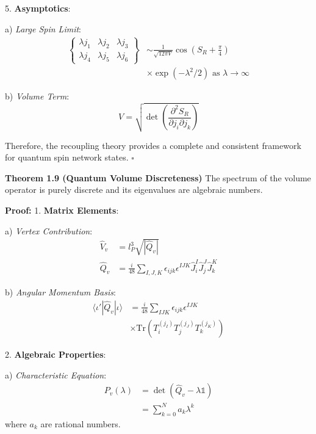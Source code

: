\documentclass[12pt,a4paper]{article}
\begin{document}
5. \textbf{Asymptotics}:
   
   a) \textit{Large Spin Limit}:
      \[
      \begin{aligned}
      \begin{Bmatrix}
      \lambda j_1 & \lambda j_2 & \lambda j_3 \\
      \lambda j_4 & \lambda j_5 & \lambda j_6
      \end{Bmatrix} &\sim \frac{1}{\sqrt{12\pi V}}\cos(S_R + \frac{\pi}{4}) \\
      &\times \exp(-\lambda^2/2) \text{ as } \lambda \to \infty
      \end{aligned}
      \]
   
   b) \textit{Volume Term}:
      \[
      V = \sqrt{\det(\frac{\partial^2 S_R}{\partial j_i \partial j_k})}
      \]

Therefore, the recoupling theory provides a complete and consistent framework for quantum spin network states. $\square$

\textbf{Theorem 1.9 (Quantum Volume Discreteness)}
The spectrum of the volume operator is purely discrete and its eigenvalues are algebraic numbers.

\textbf{Proof:}
1. \textbf{Matrix Elements}:
   
   a) \textit{Vertex Contribution}:
      \[
      \begin{aligned}
      \hat{V}_v &= l_P^3\sqrt{|\hat{Q}_v|} \\
      \hat{Q}_v &= \frac{i}{48}\sum_{I,J,K}\epsilon_{ijk}\epsilon^{IJK}\hat{J}_i^I\hat{J}_j^J\hat{J}_k^K
      \end{aligned}
      \]
   
   b) \textit{Angular Momentum Basis}:
      \[
      \begin{aligned}
      \langle\iota'|\hat{Q}_v|\iota\rangle &= \frac{i}{48}\sum_{IJK}\epsilon_{ijk}\epsilon^{IJK} \\
      &\times \text{Tr}(T_i^{(j_I)}T_j^{(j_J)}T_k^{(j_K)})
      \end{aligned}
      \]

2. \textbf{Algebraic Properties}:
   
   a) \textit{Characteristic Equation}:
      \[
      \begin{aligned}
      P_v(\lambda) &= \det(\hat{Q}_v - \lambda\mathbb{1}) \\
      &= \sum_{k=0}^N a_k\lambda^k
      \end{aligned}
      \]
      where $a_k$ are rational numbers.
   
\end{document}
